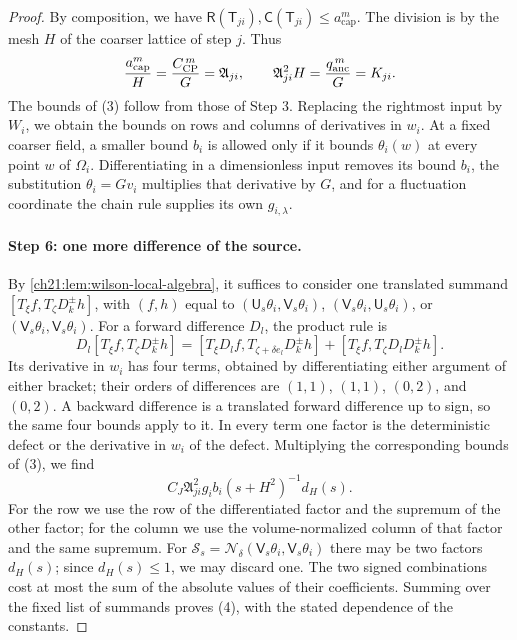 \begin{proof}
By composition, we have $\mathsf R(\mathsf T_{ji}),\mathsf C(\mathsf T_{ji})\le a_{\mathrm{cap}}^m$. The division is by the mesh $H$ of the coarser lattice of step $j$. Thus
\begin{equation}\label{ch24:eq:normalization}
 \frac{a_{\mathrm{cap}}^m}{H}=\frac{C_{\mathrm{CP}}^{\,m}}{G}=\mathfrak A_{ji},\qquad
 \mathfrak A_{ji}^2H=\frac{q_{\mathrm{anc}}^{\,m}}{G}=K_{ji}.
\end{equation}
The bounds of (3) follow from those of Step 3. Replacing the rightmost input by $W_i$, we obtain the bounds on rows and columns of derivatives in $w_i$. At a fixed coarser field, a smaller bound $b_i$ is allowed only if it bounds $\theta_i(w)$ at every point $w$ of $\Omega_i$. Differentiating in a dimensionless input removes its bound $b_i$, the substitution $\theta_i=Gv_i$ multiplies that derivative by $G$, and for a fluctuation coordinate the chain rule supplies its own $g_{i,\lambda}$.

\paragraph{Step 6: one more difference of the source.}
By \cref{ch21:lem:wilson-local-algebra}, it suffices to consider one translated summand $[T_\xi f,T_\zeta D_k^\pm h]$, with $(f,h)$ equal to $(\mathsf U_s\theta_i,\mathsf V_s\theta_i)$, $(\mathsf V_s\theta_i,\mathsf U_s\theta_i)$, or $(\mathsf V_s\theta_i,\mathsf V_s\theta_i)$. For a forward difference $D_l$, the product rule is
\[
 D_l[T_\xi f,T_\zeta D_k^\pm h]=[T_\xi D_lf,T_{\zeta+\delta e_l}D_k^\pm h]+[T_\xi f,T_\zeta D_lD_k^\pm h].
\]
Its derivative in $w_i$ has four terms, obtained by differentiating either argument of either bracket; their orders of differences are $(1,1)$, $(1,1)$, $(0,2)$, and $(0,2)$. A backward difference is a translated forward difference up to sign, so the same four bounds apply to it. In every term one factor is the deterministic defect or the derivative in $w_i$ of the defect. Multiplying the corresponding bounds of (3), we find
\[
 C_J\mathfrak A_{ji}^2g_ib_i(s+H^2)^{-1}d_H(s).
\]
For the row we use the row of the differentiated factor and the supremum of the other factor; for the column we use the volume-normalized column of that factor and the same supremum. For $\mathscr S_s=\mathcal N_\delta(\mathsf V_s\theta_i,\mathsf V_s\theta_i)$ there may be two factors $d_H(s)$; since $d_H(s)\le1$, we may discard one. The two signed combinations cost at most the sum of the absolute values of their coefficients. Summing over the fixed list of summands proves (4), with the stated dependence of the constants.
\end{proof}

